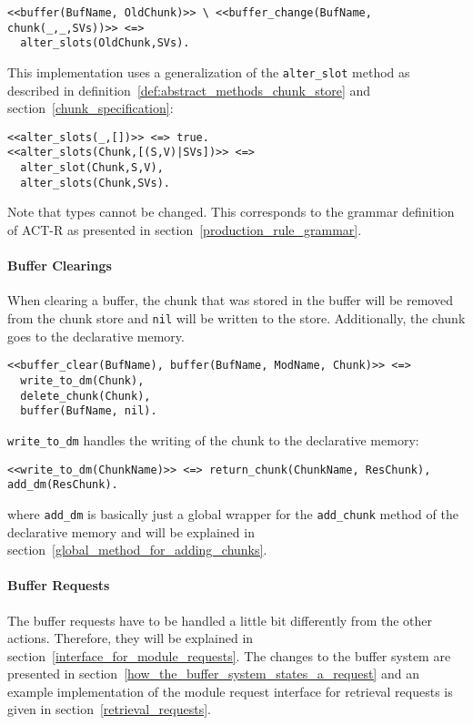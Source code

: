 \begin{lstlisting}
<<buffer(BufName, OldChunk)>> \ <<buffer_change(BufName, chunk(_,_,SVs))>> <=>
  alter_slots(OldChunk,SVs).
\end{lstlisting}

This implementation uses a generalization of the \lstinline|alter_slot| method as described in definition~\ref{def:abstract_methods_chunk_store} and section~\ref{chunk_specification}:

\begin{lstlisting}  
<<alter_slots(_,[])>> <=> true.
<<alter_slots(Chunk,[(S,V)|SVs])>> <=> 
  alter_slot(Chunk,S,V),
  alter_slots(Chunk,SVs). 
\end{lstlisting}

Note that types cannot be changed. This corresponds to the grammar definition of ACT-R as presented in section~\ref{production_rule_grammar}.


\paragraph{Buffer Clearings}

When clearing a buffer, the chunk that was stored in the buffer will be removed from the chunk store and \lstinline|nil| will be written to the store. Additionally, the chunk goes to the declarative memory.

\begin{lstlisting}
<<buffer_clear(BufName), buffer(BufName, ModName, Chunk)>> <=> 
  write_to_dm(Chunk), 
  delete_chunk(Chunk), 
  buffer(BufName, nil).
\end{lstlisting}

\lstinline|write_to_dm| handles the writing of the chunk to the declarative memory:

\begin{lstlisting}
<<write_to_dm(ChunkName)>> <=> return_chunk(ChunkName, ResChunk), add_dm(ResChunk).
\end{lstlisting}

where \lstinline|add_dm| is basically just a global wrapper for the \lstinline|add_chunk| method of the declarative memory and will be explained in section~\ref{global_method_for_adding_chunks}.

\paragraph{Buffer Requests} The buffer requests have to be handled a little bit differently from the other actions. Therefore, they will be explained in section~\ref{interface_for_module_requests}. The changes to the buffer system are presented in section~\ref{how_the_buffer_system_states_a_request} and an example implementation of the module request interface for retrieval requests is given in section~\ref{retrieval_requests}.


